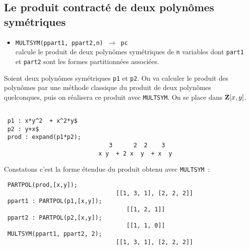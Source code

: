 \subsection{Le produit contract\'e de deux polyn\^omes sym\'etriques}
\begin{itemize}
\item{\tt MULTSYM(ppart1, ppart2,n)
  $\longrightarrow$ pc} \\
calcule le produit de deux polyn\^omes
sym\'etriques de {\tt n} variables dont {\tt part1} et {\tt part2} sont les
formes partitionn\'ees associ\'ees.

\end{itemize}
Soient deux polyn\^omes sym\'etriques {\tt p1} et {\tt p2}. On va
calculer le produit des polyn\^omes par une m\'ethode classique du 
produit de deux polyn\^omes quelconques, puis on r\'ealisera
ce produit avec {\tt MULTSYM}. On se place dans ${\bf Z}[x,y]$.
\small
\begin{verbatim}
 
 p1 : x*y^2  + x^2*y$
 p2 : y+x$
 prod : expand(p1*p2);
                              3      2  2    3
                           x y  + 2 x  y  + x  y
\end{verbatim}
\normalsize
Constatons c'est la forme \'etendue du produit obtenu avec {\tt MULTSYM}~:
\small
\begin{verbatim}
 PARTPOL(prod,[x,y]);
                                [[1, 3, 1], [2, 2, 2]]
 ppart1 : PARTPOL(p1,[x,y]);
                                   [[1, 2, 1]]
 ppart2 : PARTPOL(p2,[x,y]);
                                   [[1, 1, 0]]
 MULTSYM(ppart1, ppart2, 2);
                                [[1, 3, 1], [2, 2, 2]]
\end{verbatim}
\normalsize

